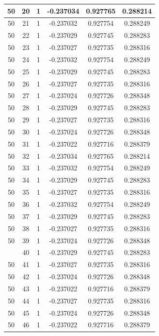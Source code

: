 \documentclass[12pt,a4paper]{article}
\numberwithin{equation}{section}
\numberwithin{figure}{section}
\numberwithin{table}{section}
\begin{document}
\begin{longtable}{|c|c|c|c|c|c|}
50 & 20 & 1 & -0.237034 & 0.927765 & 0.288214 \\ \hline
50 & 21 & 1 & -0.237032 & 0.927754 & 0.288249 \\ \hline
50 & 22 & 1 & -0.237029 & 0.927745 & 0.288283 \\ \hline
50 & 23 & 1 & -0.237027 & 0.927735 & 0.288316 \\ \hline
50 & 24 & 1 & -0.237032 & 0.927754 & 0.288249 \\ \hline
50 & 25 & 1 & -0.237029 & 0.927745 & 0.288283 \\ \hline
50 & 26 & 1 & -0.237027 & 0.927735 & 0.288316 \\ \hline
50 & 27 & 1 & -0.237024 & 0.927726 & 0.288348 \\ \hline
50 & 28 & 1 & -0.237029 & 0.927745 & 0.288283 \\ \hline
50 & 29 & 1 & -0.237027 & 0.927735 & 0.288316 \\ \hline
50 & 30 & 1 & -0.237024 & 0.927726 & 0.288348 \\ \hline
50 & 31 & 1 & -0.237022 & 0.927716 & 0.288379 \\ \hline
50 & 32 & 1 & -0.237034 & 0.927765 & 0.288214 \\ \hline
50 & 33 & 1 & -0.237032 & 0.927754 & 0.288249 \\ \hline
50 & 34 & 1 & -0.237029 & 0.927745 & 0.288283 \\ \hline
50 & 35 & 1 & -0.237027 & 0.927735 & 0.288316 \\ \hline
50 & 36 & 1 & -0.237032 & 0.927754 & 0.288249 \\ \hline
50 & 37 & 1 & -0.237029 & 0.927745 & 0.288283 \\ \hline
50 & 38 & 1 & -0.237027 & 0.927735 & 0.288316 \\ \hline
50 & 39 & 1 & -0.237024 & 0.927726 & 0.288348 \\ \hline
\pagebreak
50 & 40 & 1 & -0.237029 & 0.927745 & 0.288283 \\ \hline
50 & 41 & 1 & -0.237027 & 0.927735 & 0.288316 \\ \hline
50 & 42 & 1 & -0.237024 & 0.927726 & 0.288348 \\ \hline
50 & 43 & 1 & -0.237022 & 0.927716 & 0.288379 \\ \hline
50 & 44 & 1 & -0.237027 & 0.927735 & 0.288316 \\ \hline
50 & 45 & 1 & -0.237024 & 0.927726 & 0.288348 \\ \hline
50 & 46 & 1 & -0.237022 & 0.927716 & 0.288379 \\ \hline

\end{longtable}
\end{document}
